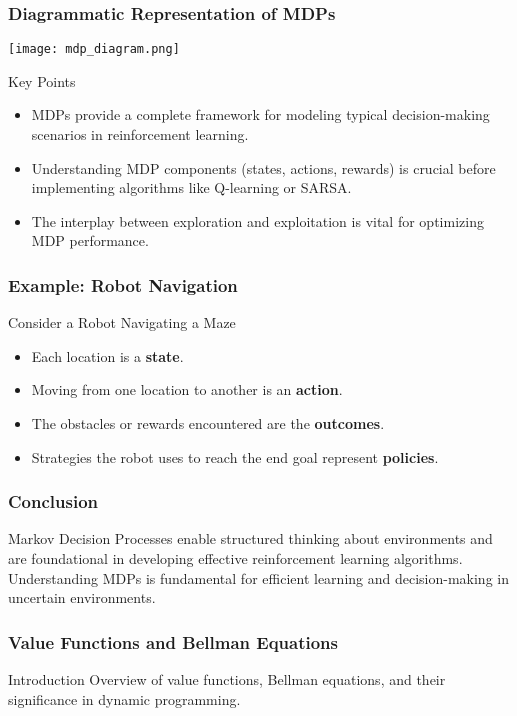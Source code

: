 \documentclass{beamer}
\begin{document}
\begin{frame}[fragile]
    \frametitle{Diagrammatic Representation of MDPs}
    \begin{center}
        \texttt{[image: mdp\_diagram.png]}
    \end{center}
    \begin{block}{Key Points}
        \begin{itemize}
            \item MDPs provide a complete framework for modeling typical decision-making scenarios in reinforcement learning.
            \item Understanding MDP components (states, actions, rewards) is crucial before implementing algorithms like Q-learning or SARSA.
            \item The interplay between exploration and exploitation is vital for optimizing MDP performance.
        \end{itemize}
    \end{block}
\end{frame}

\begin{frame}[fragile]
    \frametitle{Example: Robot Navigation}
    \begin{block}{Consider a Robot Navigating a Maze}
        \begin{itemize}
            \item Each location is a \textbf{state}.
            \item Moving from one location to another is an \textbf{action}.
            \item The obstacles or rewards encountered are the \textbf{outcomes}.
            \item Strategies the robot uses to reach the end goal represent \textbf{policies}.
        \end{itemize}
    \end{block}
\end{frame}

\begin{frame}[fragile]
    \frametitle{Conclusion}
    Markov Decision Processes enable structured thinking about environments and are foundational in developing effective reinforcement learning algorithms. 
    Understanding MDPs is fundamental for efficient learning and decision-making in uncertain environments.
\end{frame}

\begin{frame}[fragile]
    \frametitle{Value Functions and Bellman Equations}
    \begin{block}{Introduction}
        Overview of value functions, Bellman equations, and their significance in dynamic programming.
    \end{block}
\end{frame}
\end{document}
